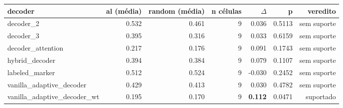\begin{tabular}{lrrrrrr}
\hline
decoder & al (média) & random (média) & n células & $\Delta$ & p & veredito \\
\hline
decoder\_2 & 0.532 & 0.461 & 9 & 0.036 & 0.5113 & sem suporte \\
decoder\_3 & 0.395 & 0.316 & 9 & 0.033 & 0.6159 & sem suporte \\
decoder\_attention & 0.217 & 0.176 & 9 & 0.091 & 0.1743 & sem suporte \\
hybrid\_decoder & 0.394 & 0.384 & 9 & 0.079 & 0.1107 & sem suporte \\
labeled\_marker & 0.512 & 0.524 & 9 & -0.030 & 0.2452 & sem suporte \\
vanilla\_adaptive\_decoder & 0.429 & 0.413 & 9 & 0.030 & 0.4782 & sem suporte \\
vanilla\_adaptive\_decoder\_wt & 0.195 & 0.170 & 9 & \textbf{0.112} & 0.0471 & suportado \\
\hline
\end{tabular}
